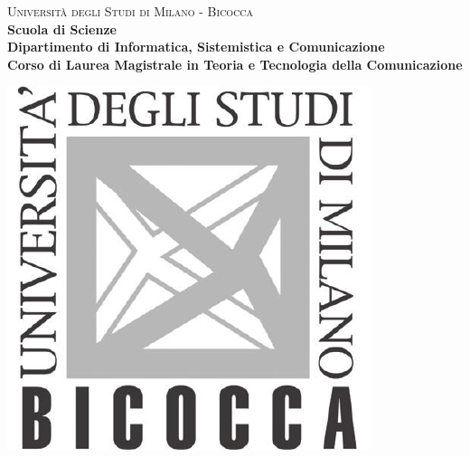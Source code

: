     \begin{titlepage}
        
        \centering
        
        \begin{minipage}[t]{1\textwidth}
        	\centering
        {
                {\LARGE\textsc{Università degli Studi di Milano - Bicocca}} \\
                \Large\textbf{Scuola di Scienze} \\
                \large\textbf{Dipartimento di Informatica, Sistemistica e Comunicazione} \\
                \textbf{Corso di Laurea Magistrale in Teoria e Tecnologia della Comunicazione} \\
                \par
        }
        \end{minipage}
        
        \centering
        \begin{minipage}[t]{\textwidth}
        	\vspace{10mm}
        \end{minipage}
         
        \centering
        \begin{minipage}[t]{1\textwidth}
       	\centering
        \includegraphics[scale=0.7]{img/logo-bicocca.pdf}
        \end{minipage}
        
        \begin{minipage}[t]{\textwidth}
        \end{minipage}
        

\end{titlepage}
